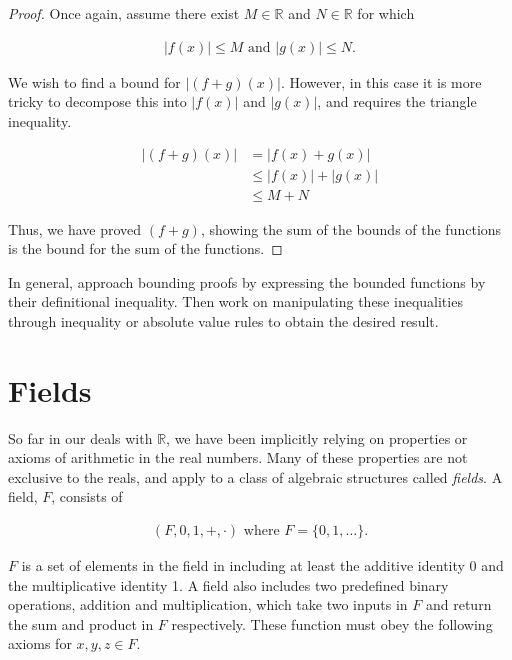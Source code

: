 \begin{proof}
	Once again, assume there exist $M \in \mathbb{R}$ and $N \in \mathbb{R}$ for which
	
	\begin{align*}
		|f(x)| \le M \text{ and } |g(x)| \le N.
	\end{align*}
	
	We wish to find a bound for $|(f + g)(x)|$. However, in this case it is more tricky to decompose this into $|f(x)|$ and $|g(x)|$, and requires the triangle inequality.
	
	\begin{align*}
		|(f + g)(x)| &= |f(x) + g(x)| \\
		&\le |f(x)| + |g(x)| \\
		&\le M + N
	\end{align*}
	
	Thus, we have proved $(f + g)$, showing the sum of the bounds of the functions is the bound for the sum of the functions.
\end{proof}
\vspace{\baselineskip}

In general, approach bounding proofs by expressing the bounded functions by their definitional inequality. Then work on manipulating these inequalities through inequality or absolute value rules to obtain the desired result.

\section{Fields}

So far in our deals with $\mathbb{R}$, we have been implicitly relying on properties or axioms of arithmetic in the real numbers. Many of these properties are not exclusive to the reals, and apply to a class of algebraic structures called \emph{fields}. A field, $F$, consists of

\begin{align*}
	(F, 0, 1, +, \cdot) \text{ where } F = \{ 0, 1, \dots \}. 
\end{align*}

$F$ is a set of elements in the field in including at least the additive identity 0 and the multiplicative identity 1. A field also includes two predefined binary operations, addition and multiplication, which take two inputs in $F$ and return the sum and product in $F$ respectively. These function must obey the following axioms for $x, y, z \in F$.

